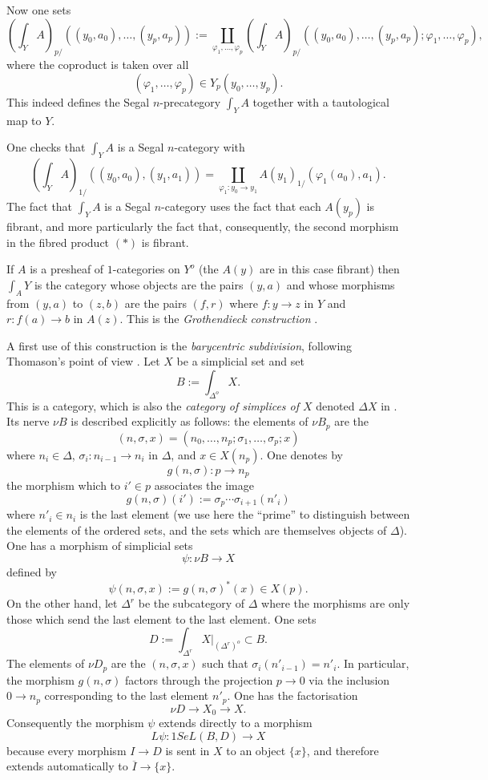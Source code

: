 Now one sets
$$
(\int _YA)_{p/}((y_0,a_0),\ldots , (y_p,a_p))
:=
\coprod _{\varphi _1,\ldots , \varphi _p}(\int _YA)_{p/}((y_0,a_0),\ldots ,
(y_p,a_p); \varphi _1,\ldots , \varphi _p),
$$
where the coproduct is taken over all
$$
(\varphi _1,\ldots , \varphi _p)\in Y_{p}(y_0,\ldots , y_p).
$$
This indeed defines the Segal $n$-precategory $\int _YA$ together with a
tautological map to $Y$.

One checks that $\int _YA$ is a Segal $n$-category with
$$
(\int _YA)_{1/}((y_0,a_0), (y_1,a_1))=\coprod _{\varphi _1: y_0\rightarrow y_1}
A(y_1)_{1/}(\varphi _1(a_0), a_1).
$$
The fact that $\int _YA$ is a Segal $n$-category uses the fact that
each $A(y_p)$ is fibrant, and more particularly the fact that, consequently,
the second morphism in the fibred product $(\ast )$ is
fibrant.




If $A$ is a presheaf of $1$-categories on $Y^o$ (the $A(y)$ are in this case
fibrant) then $\int _AY$ is the category whose objects are
the pairs $(y,a)$ and whose morphisms from $(y,a)$ to $(z,b)$ are the pairs
$(f,r)$ where $f: y\rightarrow z$ in $Y$ and $r: f(a)\rightarrow b$ in $A(z)$.
This is the {\em Grothendieck construction} \cite{SGA1} \cite{ThomasonLimits}
\cite{DwyerKan2}.


A first use of this construction is the {\em barycentric
subdivision}, following Thomason's point of view \cite{ThomasonLimits}.
Let $X$ be a simplicial set and set
$$
B:= \int _{\Delta ^o} X.
$$
This is a category, which is also the {\em category of simplices of $X$}
denoted $\Delta X$ in \cite{Hirschhorn} \cite{DHK}.
Its nerve $\nu B$ is described explicitly as follows: the elements of
$\nu B_p$ are the
$$
(n,\sigma , x)= (n_0,\ldots , n_p; \sigma _1,\ldots , \sigma _p; x)
$$
where $n_i\in \Delta$, $\sigma _i: n_{i-1}\rightarrow n_i$ in $\Delta$,
and $x\in X(n_p)$. One denotes by
$$
g(n,\sigma ): p\rightarrow n_p
$$
the morphism which to $i'\in p$ associates the image
$$
g(n,\sigma )(i'):= \sigma _p\cdots \sigma _{i+1}(n'_i)
$$
where $n'_i\in n_i$ is the last element (we use here the ``prime''
to distinguish between the elements of the ordered sets, and the sets
which are themselves objects of $\Delta$). One has a morphism
of simplicial sets
$$
\psi : \nu B \rightarrow X
$$
defined by
$$
\psi (n,\sigma , x):= g(n,\sigma )^{\ast} (x)\in X(p).
$$
On the other hand, let $\Delta ^r$ be the subcategory of $\Delta$ where the
morphisms are only those which send the last element to the last
element. One sets
$$
D:=\int _{\Delta ^r} X|_{(\Delta ^r)^o} \subset B.
$$
The elements of $\nu D_p$ are the $(n,\sigma , x)$ such that
$\sigma _i(n'_{i-1})=n'_i$. In particular, the morphism
$g(n,\sigma )$ factors through the projection $p\rightarrow 0$
via the inclusion $0\rightarrow n_p$ corresponding to the last element $n'_p$.
One has the factorisation
$$
\nu D\rightarrow X_0 \rightarrow X.
$$
Consequently the morphism $\psi$ extends directly to a morphism
$$
L\psi : 1SeL(B,D)\rightarrow X
$$
because every morphism $I\rightarrow D$ is sent in $X$ to an object $\{ x\}$,
and therefore extends automatically to $\overline{I}\rightarrow \{ x\}$.


